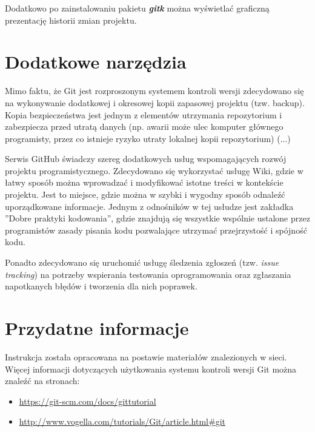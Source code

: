 Dodatkowo po zainstalowaniu pakietu \textit{\textbf{gitk}} można wyświetlać graficzną prezentację historii zmian projektu.

\section{Dodatkowe narzędzia}
	Mimo faktu, że Git jest rozproszonym systemem kontroli wersji zdecydowano się na wykonywanie dodatkowej i okresowej kopii zapasowej projektu (tzw. backup). Kopia bezpieczeństwa jest jednym z elementów utrzymania repozytorium i zabezpiecza przed utratą danych (np. awarii może ulec komputer głównego programisty, przez co istnieje ryzyko utraty lokalnej kopii repozytorium) (...)

Serwis GitHub świadczy szereg dodatkowych usług wspomagających rozwój projektu programistycznego. Zdecydowano się wykorzystać usługę Wiki, gdzie w łatwy sposób można wprowadzać i modyfikować istotne treści w kontekście projektu. Jest to miejsce, gdzie można w szybki i wygodny sposób odnaleźć uporządkowane informacje. Jednym z odnośników w tej usłudze jest zakładka ''Dobre praktyki kodowania'', gdzie znajdują się wszystkie wspólnie ustalone przez programistów zasady pisania kodu pozwalające utrzymać przejrzystość i spójność kodu.

	Ponadto zdecydowano się uruchomić usługę śledzenia zgłoszeń (tzw. \textit{issue tracking}) na potrzeby wspierania testowania oprogramowania oraz zgłaszania napotkanych błędów i tworzenia dla nich poprawek.

\section{Przydatne informacje}
Instrukcja została opracowana na postawie materiałów znalezionych w sieci. Więcej informacji dotyczących użytkowania systemu kontroli wersji Git można znaleźć na stronach:
\begin{itemize}
\item \url{https://git-scm.com/docs/gittutorial}
\item \url{http://www.vogella.com/tutorials/Git/article.html\#git}
\end{itemize}